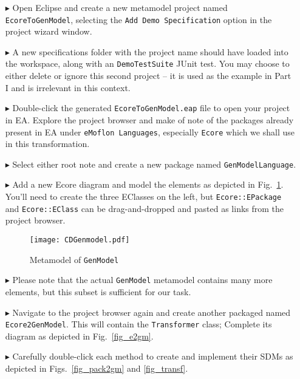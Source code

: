 \begin{enumerate}

\item[$\blacktriangleright$] Open Eclipse and create a new metamodel project named \texttt{Ecore\-To\-Gen\-Model}, selecting the \texttt{Add Demo Specification}
option in the project wizard window.

\item[$\blacktriangleright$] A new specifications folder with the project name should have loaded into the workspace, along with an \texttt{DemoTestSuite} JUnit
test. You may choose to either delete or ignore this second project -- it is used as the example in Part I and is irrelevant in this context.

\item[$\blacktriangleright$] Double-click the generated \texttt{Ecore\-To\-Gen\-Model.eap} file to open your project in EA. Explore the project browser and
make of note of the packages already present in EA under \texttt{eMoflon Languages}, especially \texttt{Ecore} which we shall use in this transformation.

\item[$\blacktriangleright$] Select either root note and create a new package named \texttt{Gen\-Model\-Language}. 

\item[$\blacktriangleright$] Add a new Ecore diagram and model the elements as depicted in Fig.~\ref{fig_gMM}. You'll need to create the three EClasses on
the left, but \texttt{Ecore::EPackage} and \texttt{Ecore::EClass} can be drag-and-dropped and pasted as links from the project browser. 

\vspace{0.5cm}

\begin{figure}[htbp]
\begin{center}  
	\texttt{[image: CDGenmodel.pdf]}
	\caption{Metamodel of \texttt{GenModel}}  
\label{fig_gMM}
\end{center}
\end{figure} 

\vspace{0.5cm}

\item[$\blacktriangleright$] Please note that the actual \texttt{GenModel} metamodel contains many more elements, but this subset is sufficient for our
task.

\item[$\blacktriangleright$] Navigate to the project browser again and create another packaged named \texttt{Ecore2GenModel}.  This will contain the
\texttt{Transformer} class; Complete its diagram as depicted in Fig.~\ref{fig_e2gm}.

\item[$\blacktriangleright$] Carefully double-click each method to create and implement their SDMs as depicted in Figs.~\ref{fig_pack2gm} and \ref{fig_transf}.
\end{enumerate}

